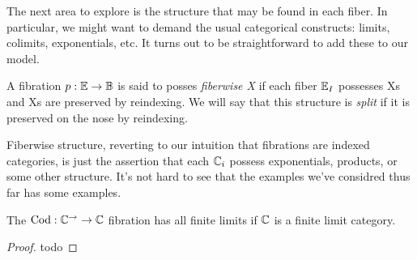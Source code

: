 The next area to explore is the structure that may be found in each
fiber. In particular, we might want to demand the usual categorical
constructs: limits, colimits, exponentials, etc. It turns out to be
straightforward to add these to our model.
\begin{defn}\label{defn:fibrations:fiberwiseX}
  A fibration $p : \mathbb{E} \to \mathbb{B}$ is said to posses \emph{fiberwise
    X} if each fiber $\mathbb{E}_I$ possesses Xs and Xs are preserved by
  reindexing. We will say that this structure is \emph{split} if it is
  preserved on the nose by reindexing.
\end{defn}
Fiberwise structure, reverting to our intuition that fibrations are
indexed categories, is just the assertion that each $\mathbb{C}_i$ possess
exponentials, products, or some other structure. It's not hard to see
that the examples we've considred thus far has some examples.
\begin{example}\label{defn:fibrations:codfiberwiseproducts}
  The $\operatorname{Cod} : \mathbb{C}^{\to} \to \mathbb{C}$ fibration has all finite limits
  if $\mathbb{C}$ is a finite limit category.
\end{example}
\begin{proof}
  todo
\end{proof}

